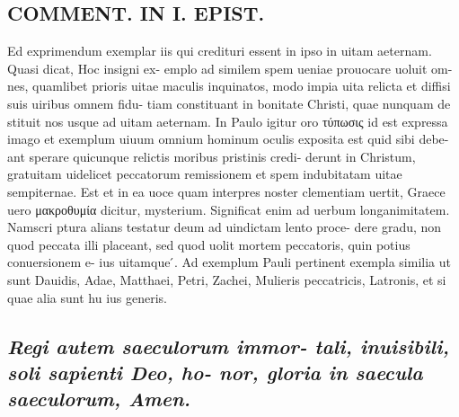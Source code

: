 \documentclass{article}
\begin{document}
\begin{pages}
\section*{COMMENT. IN I. EPIST. }\pstart Ed exprimendum exemplar iis qui credituri essent in ipso in uitam aeternam. Quasi dicat, Hoc insigni ex- emplo ad similem spem ueniae prouocare uoluit om- nes, quamlibet prioris uitae maculis inquinatos, modo impia uita relicta et diffisi suis uiribus omnem fidu- tiam constituant in bonitate Christi, quae nunquam de stituit nos usque ad uitam aeternam. In Paulo igitur oro τύπωσις id est expressa imago et exemplum uiuum omnium hominum oculis exposita est quid sibi debe- ant sperare quicunque relictis moribus pristinis credi- derunt in Christum, gratuitam uidelicet peccatorum remissionem et spem indubitatam uitae sempiternae. Est et in ea uoce quam interpres noster clementiam uertit, Graece uero μακροθυμία dicitur, mysterium. Significat enim ad uerbum longanimitatem. Namscri ptura alians testatur deum ad uindictam lento proce- dere gradu, non quod peccata illi placeant, sed quod uolit mortem peccatoris, quin potius conuersionem e- ius uitamque ́. Ad exemplum Pauli pertinent exempla similia ut sunt Dauidis, Adae, Matthaei, Petri, Zachei, Mulieris peccatricis, Latronis, et si quae alia sunt hu ius generis.  \pend
{}
{}
\subsection*{\textit{Regi autem saeculorum immor- tali, inuisibili, soli sapienti Deo, ho- nor, gloria in saecula saeculorum, Amen. }}

\end{pages}
\end{document}
